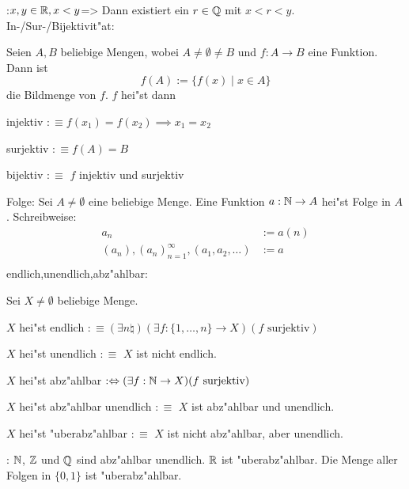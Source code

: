 \theorem:$x,y\in\mathbb R,x<y$=>{
  Dann existiert ein $r\in\mathbb Q$ mit $x<r<y$.
  }
 In-/Sur-/Bijektivit"at:{
  Seien $A,B$ beliebige Mengen, wobei $A\ne\emptyset\ne B$
  und $f:A\rightarrow B$ eine Funktion. Dann ist
  \[f(A):=\{f(x)\mid x\in A\} 
    \] 
  die Bildmenge von $f$. $f$ hei"st dann
  \begin{stmts}
    \item injektiv $:\equiv f(x_1)=f(x_2)\implies x_1=x_2$
    \item surjektiv $:\equiv f(A)=B$
    \item bijektiv $:\equiv$ $f$ injektiv und surjektiv
    \end{stmts}
  }
 Folge:{
  Sei $A\ne\emptyset$ eine beliebige Menge. Eine Funktion
  $a:\mathbb N\rightarrow A$ hei"st Folge in $A$.
  Schreibweise: 
  \begin{align*}
    a_n&:=a(n) \tag{``n-tes Folgenglied''}\\
    (a_n), {(a_n)}_{n=1}^{\infty}, (a_1,a_2,\ldots)&:=a\\
    \end{align*}
  }
 endlich,unendlich,abz"ahlbar:{
  Sei $X\ne\emptyset$ beliebige Menge.
  \begin{stmts}
    \item $X$ hei"st endlich $:\equiv (\exists n\natural)
      (\exists f:\{1,\ldots,n\}\to X)(f \text{ surjektiv})$
    \item $X$ hei"st unendlich $:\equiv$ $X$ ist nicht endlich.
    \item $X$ hei"st abz"ahlbar $:\Leftrightarrow
      (\exists f:\mathbb N\to X)(f \text{ surjektiv})$
    \item $X$ hei"st abz"ahlbar unendlich $:\equiv$
      $X$ ist abz"ahlbar und unendlich.
    \item $X$ hei"st "uberabz"ahlbar $:\equiv$
      $X$ ist nicht abz"ahlbar, aber unendlich.
    \end{stmts}
  }
\remark:{
  $\mathbb N$, $\mathbb Z$ und $\mathbb Q$ sind abz"ahlbar unendlich. $\mathbb R$ ist
  "uberabz"ahlbar. Die Menge aller Folgen in $\{0,1\}$ ist
  "uberabz"ahlbar.
  }

